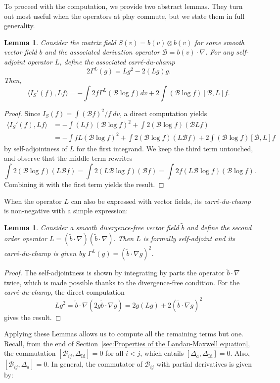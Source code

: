\documentclass[11pt,a4paper]{article}
\theoremstyle{definition}
\theoremstyle{plain}
\newtheorem{lemma}[defi]{Lemma}
\DeclareMathOperator*{\Id}{Id}
\newcommand{\jap}[1]{\langle #1 \rangle}
\begin{document}
To proceed with the computation, we provide two abstract lemmas. They turn out most useful when the operators at play commute, but we state them in full generality.
\begin{lemma}
\label{lem:abs1}
    Consider the matrix field $S(v)=b(v)\otimes b(v)$ for some smooth vector field $b$ and the associated derivation operator $\mathcal{B}=b(v)\cdot \nabla$. For any self-adjoint operator $L$, define the associated \textit{carré-du-champ}
    $$2\Gamma^L(g)=Lg^2-2(Lg)g.$$
    Then,
    $$\jap{I_S'(f),Lf}=-\int 2f\Gamma^L(\mathcal{B} \log f)  dv+2\int(\mathcal{B}\log f)[\mathcal{B},L]f.$$
\end{lemma}
\begin{proof}
    Since $I_S(f) = \int ( \mathcal{B} f)^2/f \ dv$, a direct computation yields
    \begin{align*}
        \jap{I_S'(f),Lf} &= -\int (Lf)(\mathcal{B} \log f)^2 +\int  2 (\mathcal{B}\log f )(\mathcal{B} Lf)\\
       & = -\int f L( \mathcal{B} \log f)^2 +\int  2 (\mathcal{B} \log f )(L\mathcal{B} f) + 2\int( \mathcal{B}\log f)[\mathcal{B},L]f
    \end{align*}
    by self-adjointness of $L$ for the first integrand. We keep the third term untouched, and observe that the middle term rewrites
    $$\int 2 (\mathcal{B} \log f )(L\mathcal{B} f)=\int  2( L\mathcal{B}\log f )(\mathcal{B} f)=\int  2 f(L\mathcal{B} \log f )(\mathcal{B}  \log f).$$
    Combining it with the first term yields the result.
\end{proof}
When the operator $L$ can also be expressed with vector fields, its \textit{carré-du-champ} is non-negative with a simple expression:
\begin{lemma}
\label{lem:abs2}
    Consider a smooth divergence-free vector field $\tilde{b}$ and define the second order operator $L=(\tilde{b}\cdot \nabla)( \tilde{b}\cdot \nabla).$ Then $L$ is formally self-adjoint and its carré-du-champ is given by $\Gamma^L(g) = ( \tilde{b}\cdot \nabla g)^2$.
\end{lemma}
\begin{proof}
    The self-adjointness is shown by integrating by parts the operator $\tilde{b}\cdot \nabla$ twice, which is made possible thanks to the divergence-free condition. For the \textit{carré-du-champ}, the direct computation
    $$Lg^2=\tilde{b}\cdot \nabla(2g\tilde{b}\cdot \nabla g)=2g(Lg)+2(\tilde{b}\cdot \nabla g)^2$$
    gives the result.
\end{proof}
Applying these Lemmas allows us to compute all the remaining terms but one. Recall, from the end of Section~\ref{sec:Properties of the Landau-Maxwell equation}, the commutation $[\mathcal{B}_{ij},\Delta_{\Id}]=0$ for all $i<j$, which entails $[\Delta_a,\Delta_{\Id}]=0$. Also, $[\mathcal{B}_{ij},\Delta_{a}]=0$. In general, the commutator of $\mathcal{B}_{ij}$ with partial derivatives is given by:
\end{document}
